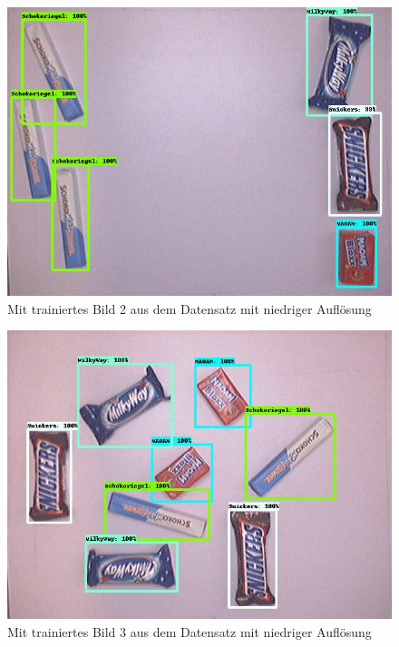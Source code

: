     \begin{figure}[H]
        \centering
        \includegraphics[angle = 90, width = \textwidth]{Bilder/models/model_comparison/ssd_mobilenet_v1_fpn_640x640_coco17_tpu-8/trained_2.jpg}
        \caption{Mit trainiertes Bild 2 aus dem Datensatz mit niedriger Auflösung}
    \end{figure}
    
    \begin{figure}[H]
        \centering
        \includegraphics[angle = 90, width = \textwidth]{Bilder/models/model_comparison/ssd_mobilenet_v1_fpn_640x640_coco17_tpu-8/trained_3.jpg}
        \caption{Mit trainiertes Bild 3 aus dem Datensatz mit niedriger Auflösung}
    \end{figure}
    
